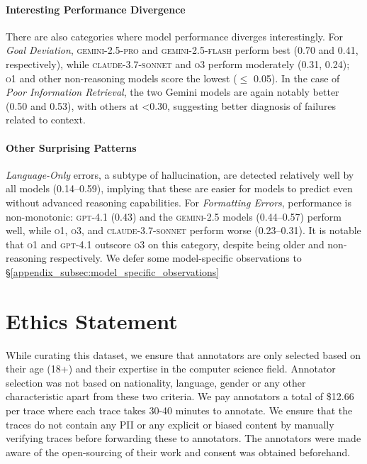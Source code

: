 \documentclass[11pt]{article}
\begin{document}
\paragraph{Interesting Performance Divergence}
There are also categories where model performance diverges interestingly. For \textit{Goal Deviation}, \textsc{gemini-2.5-pro} and \textsc{gemini-2.5-flash} perform best (0.70 and 0.41, respectively), while \textsc{claude-3.7-sonnet} and \textsc{o3} perform moderately (0.31, 0.24); \textsc{o1} and other non-reasoning models score the lowest ($\leq$ 0.05). In the case of \textit{Poor Information Retrieval}, the two Gemini models are again notably better (0.50 and 0.53), with others at <0.30, suggesting better diagnosis of failures related to context.

\paragraph{Other Surprising Patterns}
\textit{Language-Only} errors, a subtype of hallucination, are detected relatively well by all models (0.14–0.59), implying that these are easier for models to predict even without advanced reasoning capabilities. For \textit{Formatting Errors}, performance is non-monotonic: \textsc{gpt-4.1} (0.43) and the \textsc{gemini-2.5} models (0.44–0.57) perform well, while \textsc{o1}, \textsc{o3}, and \textsc{claude-3.7-sonnet} perform worse (0.23–0.31). It is notable that \textsc{o1} and \textsc{gpt-4.1} outscore \textsc{o3} on this category, despite being older and non-reasoning respectively. We defer some model-specific observations to \S\ref{appendix_subsec:model_specific_observations}






\section*{Ethics Statement}
While curating this dataset, we ensure that annotators are only selected based on their age (18+) and their expertise in the computer science field. Annotator selection was not based on nationality, language, gender or any other characteristic apart from these two criteria. We pay annotators a total of \$12.66 per trace where each trace takes 30-40 minutes to annotate. We ensure that the traces do not contain any PII or any explicit or biased content by manually verifying traces before forwarding these to annotators. The annotators were made aware of the open-sourcing of their work and consent was obtained beforehand.
\end{document}
